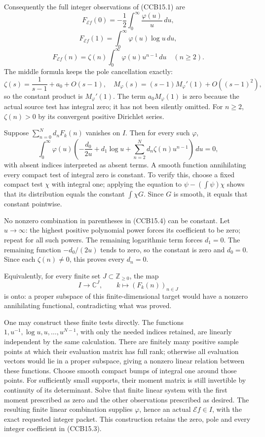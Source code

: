 Consequently the full integer observations of (CCB15.1) are \[
F_{\mathcal Ef}(0)
=-\frac12\int_0^\infty\frac{\varphi(u)}u\,du,
\] \[
F_{\mathcal Ef}(1)
=\int_0^\infty\varphi(u)\log u\,du,
\] \[
F_{\mathcal Ef}(n)
=\zeta(n)\int_0^\infty\varphi(u)u^{n-1}\,du
\quad(n\ge2).
\tag{CCB15.3}
\] The middle formula keeps the pole cancellation exactly: \[
\zeta(s)=\frac1{s-1}+a_0+O(s-1),\quad
M_\varphi(s)=(s-1)M_\varphi'(1)+O((s-1)^2),
\] so the constant product is \(M_\varphi'(1)\). The term
\(a_0M_\varphi(1)\) is zero because the actual source test has integral
zero; it has not been silently omitted. For \(n\ge2\), \(\zeta(n)>0\) by
its convergent positive Dirichlet series.

Suppose \(\sum_{n=0}^N d_nF_k(n)\) vanishes on \(I\). Then for every
such \(\varphi\), \[
\int_0^\infty\varphi(u)
\left(-\frac{d_0}{2u}+d_1\log u+
\sum_{n=2}^Nd_n\zeta(n)u^{n-1}\right)\,du=0,
\tag{CCB15.4}
\] with absent indices interpreted as absent terms. A smooth function
annihilating every compact test of integral zero is constant. To verify
this, choose a fixed compact test \(\chi\) with integral one; applying
the equation to \(\psi-(\int\psi)\chi\) shows that its distribution
equals the constant \(\int\chi G\). Since \(G\) is smooth, it equals
that constant pointwise.

No nonzero combination in parentheses in (CCB15.4) can be constant. Let
\(u\to\infty\): the highest positive polynomial power forces its
coefficient to be zero; repeat for all such powers. The remaining
logarithmic term forces \(d_1=0\). The remaining function \(-d_0/(2u)\)
tends to zero, so the constant is zero and \(d_0=0\). Since each
\(\zeta(n)\ne0\), this proves every \(d_n=0\).

Equivalently, for every finite set \(J\subset\mathbb Z_{\ge0}\), the map
\[
I\longrightarrow\mathbb C^J,\qquad
k\longmapsto(F_k(n))_{n\in J}
\tag{CCB15.5}
\] is onto: a proper subspace of this finite-dimensional target would
have a nonzero annihilating functional, contradicting what was proved.

One may construct these finite tests directly. The functions
\(1,u^{-1},\log u,u,\ldots,u^{N-1}\), with only the needed indices
retained, are linearly independent by the same calculation. There are
finitely many positive sample points at which their evaluation matrix
has full rank; otherwise all evaluation vectors would lie in a proper
subspace, giving a nonzero linear relation between these functions.
Choose smooth compact bumps of integral one around those points. For
sufficiently small supports, their moment matrix is still invertible by
continuity of its determinant. Solve that finite linear system with the
first moment prescribed as zero and the other observations prescribed as
desired. The resulting finite linear combination supplies \(\varphi\),
hence an actual \(\mathcal Ef\in I\), with the exact requested integer
packet. This construction retains the zero, pole and every integer
coefficient in (CCB15.3).

